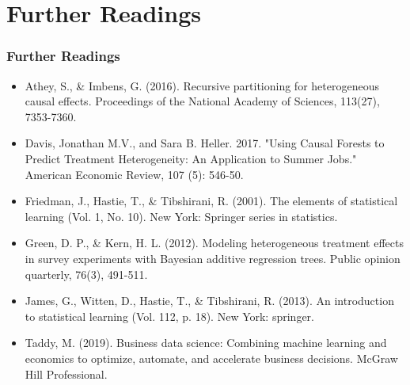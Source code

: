 \documentclass[
  shownotes,
  xcolor={svgnames},
  hyperref={colorlinks,citecolor=DarkBlue,linkcolor=DarkRed,urlcolor=DarkBlue}
  , aspectratio=169]{beamer}
\begin{document}
\section{Further Readings}
\begin{frame}
\frametitle{Further Readings}

\begin{itemize}

  \item Athey, S., \& Imbens, G. (2016). Recursive partitioning for heterogeneous causal effects. Proceedings of the National Academy of Sciences, 113(27), 7353-7360.
  \medskip
  \item Davis, Jonathan M.V., and Sara B. Heller. 2017. "Using Causal Forests to Predict Treatment Heterogeneity: An Application to Summer Jobs." American Economic Review, 107 (5): 546-50. 
  \medskip
  \item Friedman, J., Hastie, T., \& Tibshirani, R. (2001). The elements of statistical learning (Vol. 1, No. 10). New York: Springer series in statistics.
  \medskip
  \item Green, D. P., \& Kern, H. L. (2012). Modeling heterogeneous treatment effects in survey experiments with Bayesian additive regression trees. Public opinion quarterly, 76(3), 491-511.
  \medskip
  \item James, G., Witten, D., Hastie, T., \& Tibshirani, R. (2013). An introduction to statistical learning (Vol. 112, p. 18). New York: springer.
  \medskip
  \item Taddy, M. (2019). Business data science: Combining machine learning and economics to optimize, automate, and accelerate business decisions. McGraw Hill Professional.
  

  
\end{itemize}

\end{frame}





\end{document}
